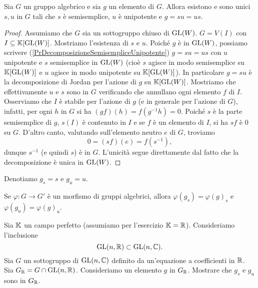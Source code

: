 \begin{theorem} Sia $G$ un gruppo algebrico e sia $g$ un elemento di $G$. Allora esistono e sono unici $s,u$ in $G$ tali che $s$ è semisemplice, $u$ è unipotente e $g=su=us$.
\end{theorem}
\begin{proof}
    Assumiamo che $G$ sia un sottogruppo chiuso di $\mathrm{GL}(W)$. $G=V(I)$ con $I\subseteq \mathbb{K}[\mathrm{GL}(W)]$. Mostriamo l'esistenza di $s$ e $u$. Poiché $g$ è in $\mathrm{GL}(W)$, possiamo scrivere (\ref{PrDecomposizioneSemisempliceUnipotente}) $g=su=us$ con $u$ unipotente e $s$ semisemplice in $\mathrm{GL}(W)$ (cio\`e $s$ agisce in modo semisemplice su $\mathbb{K}[\mathrm{GL}(W)]$ e $u$ agisce in modo unipotente su $\mathbb{K}[\mathrm{GL}(W)]$). In particolare $g=su$ è la decomposizione di Jordan per l'azione di $g$ su $\mathbb{K}[\mathrm{GL}(W)]$.
    Mostriamo che effettivamente $u$ e $s$ sono in $G$ verificando che annullano ogni elemento $f$ di $I$. Osserviamo che $I$ è stabile per l'azione di $g$ (e in generale per l'azione di $G$), infatti, per ogni $h$ in $G$ si ha $(gf)(h)=f(g^{-1}h)=0$. Poiché $s$ è la parte semisemplice di $g$, $s(I)$ è contenuto in $I$ e se $f$ è un elemento di $I$, si ha $sf$ è $0$ su $G$. D'altro canto, valutando sull'elemento neutro $e$ di $G$, troviamo \[0=(sf)(e)=f(s^{-1}),\] dunque $s^{-1}$ (e quindi $s$) è in $G$. L'unicità segue direttamente dal fatto che la decomposizione è unica in $\mathrm{GL}(W)$.
\end{proof}
\begin{notation}
    Denotiamo $g_s=s$ e $g_u=u$.
\end{notation}
\begin{exercise}
    Se $\varphi\colon G \to G'$ è un morfismo di gruppi algebrici, allora $\varphi(g_s)=\varphi(g)_s$ e $\varphi(g_u)=\varphi(g)_u$.
\end{exercise}

\begin{exercise}
    Sia $\mathbb{K}$ un campo perfetto (assumiamo per l'esercizio $\mathbb{K}=\mathbb{R}$). Consideriamo l'inclusione \[\mathrm{GL}(n,\mathbb{R})\subset \mathrm{GL}(n,\mathbb{C}).\]
    Sia $G$ un sottogruppo di $\mathrm{GL}(n,\mathbb{C})$ definito da un'equazione a coefficienti in $\mathbb{R}$. Sia $G_{\mathbb{R}}=G\cap \mathrm{GL}(n,\mathbb{R})$. Consideriamo un elemento $g$ in $G_{\mathbb{R}}$. Mostrare che $g_s$ e $g_u$ sono in $G_{\mathbb{R}}$.
\end{exercise}


